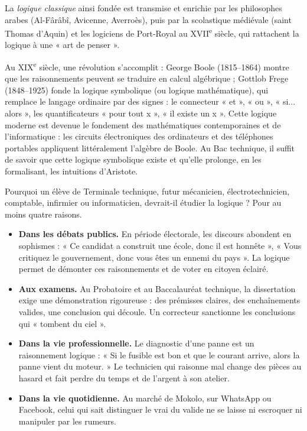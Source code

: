 \documentclass[11pt]{article}
\newcommand{\cle}[1]{{\popxbold\color{popdark}#1}}
\newcounter{popsec}
\newcounter{popsub}
\newcommand{\courssub}[1]{%
  \stepcounter{popsub}%
  \par\vspace{9pt}\noindent{\popxbold\fontsize{11.5}{13}\selectfont\color{popink}{\color{poporange}\thepopsec.\thepopsub}\hspace{6pt}#1}\par\nopagebreak\vspace{4pt}
}
\begin{document}
La \emph{logique classique} ainsi fondée est transmise et enrichie par les philosophes arabes (Al-Fârâbî, Avicenne, Averroès), puis par la scolastique médiévale (saint Thomas d'Aquin) et les logiciens de Port-Royal au XVII\textsuperscript{e} siècle, qui rattachent la logique à une « art de penser ».

Au XIX\textsuperscript{e} siècle, une révolution s'accomplit : George Boole (1815--1864) montre que les raisonnements peuvent se traduire en calcul algébrique ; Gottlob Frege (1848--1925) fonde la \cle{logique symbolique} (ou logique mathématique), qui remplace le langage ordinaire par des signes : le connecteur « et », « ou », « si... alors », les quantificateurs « pour tout x », « il existe un x ». Cette logique moderne est devenue le fondement des mathématiques contemporaines et de l'informatique : les circuits électroniques des ordinateurs et des téléphones portables appliquent littéralement l'algèbre de Boole. Au Bac technique, il suffit de savoir que cette logique symbolique existe et qu'elle prolonge, en les formalisant, les intuitions d'Aristote.

\courssub{L'intérêt pratique de la logique}

Pourquoi un élève de Terminale technique, futur mécanicien, électrotechnicien, comptable, infirmier ou informaticien, devrait-il étudier la logique ? Pour au moins quatre raisons.

\begin{itemize}
\item \textbf{Dans les débats publics.} En période électorale, les discours abondent en sophismes : « Ce candidat a construit une école, donc il est honnête », « Vous critiquez le gouvernement, donc vous êtes un ennemi du pays ». La logique permet de démonter ces raisonnements et de voter en citoyen éclairé.
\item \textbf{Aux examens.} Au Probatoire et au Baccalauréat technique, la dissertation exige une démonstration rigoureuse : des prémisses claires, des enchaînements valides, une conclusion qui découle. Un correcteur sanctionne les conclusions qui « tombent du ciel ».
\item \textbf{Dans la vie professionnelle.} Le diagnostic d'une panne est un raisonnement logique : « Si le fusible est bon et que le courant arrive, alors la panne vient du moteur. » Le technicien qui raisonne mal change des pièces au hasard et fait perdre du temps et de l'argent à son atelier.
\item \textbf{Dans la vie quotidienne.} Au marché de Mokolo, sur WhatsApp ou Facebook, celui qui sait distinguer le vrai du valide ne se laisse ni escroquer ni manipuler par les rumeurs.
\end{itemize}
\end{document}

